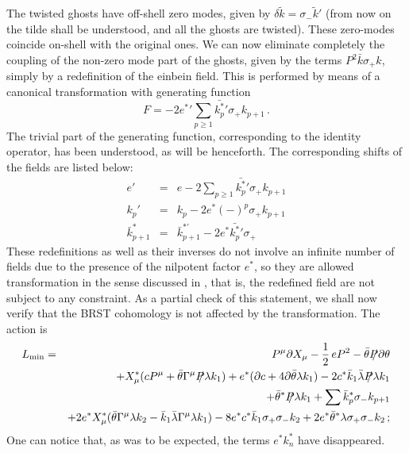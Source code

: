 \documentclass[a4paper,12pt]{article}
\begin{document}
The twisted ghosts have off-shell zero modes, given by $\delta \tilde
k = \sigma_- \tilde k'$ (from now on the tilde shall be understood,
and all the ghosts are twisted). These zero-modes coincide on-shell with the
original ones. We can now  eliminate completely the coupling of the
non-zero mode part of the ghosts, given by the terms $P^2 \bar
  k \sigma_+ k$, simply by a redefinition of the einbein
field. This is performed by means of a canonical transformation with
generating function
\begin{equation}
  F =  - 2 {e^*}' \sum_{p \geq 1} \bar {k_p^*}' \sigma_+ k_{p+1} \, . 
\end{equation}
The trivial part of the generating function, corresponding to the
identity operator, has been understood, as will be henceforth.
The corresponding shifts of the fields are listed below:
\begin{eqnarray}
  e'    &=& e - 2 \sum_{p \geq 1} \bar {k_p^*}' \sigma_+ k_{p+1} \nonumber\\
  k_p'  &=& k_p -2 e^* (-)^p \sigma_+ k_{p+1}  \\
  \bar k_{p+1}^* &=& {\bar k}_{p+1}^{*'} -2e^* \bar {k_p^*}' \sigma_+
  \nonumber 
\end{eqnarray}
These redefinitions as well as their inverses do not involve an
infinite number of fields due to the presence of the nilpotent factor
$e^*$, so they are allowed transformation in the sense discussed in
\cite{kallosh}, that is, the redefined field are not subject to any
constraint.
As a partial check of this statement, we shall now verify that the
BRST cohomology is not affected by the transformation.
The action is
\begin{eqnarray} \label{minaction}
 L_{\rm min}  & = & P^\mu \partial X_\mu -{1 \over 2}\, e P^2 -\bar\theta \SL{P}
 \partial\theta \nonumber \\
 && + X_\mu ^* (c P^\mu + \bar \theta \Gamma^\mu \SL{P} \lambda  k_1 ) + e^*
 (\partial c + 4 \partial \bar \theta \lambda k_1 ) -2 c^* \bar k_1
 \bar\lambda \SL{P} \lambda k_1  \nonumber \\
&& + \bar\theta^* \SL{P} \lambda k_1 + \sum 
   \bar k_p^* \sigma_- k_{p+1}\\
&& + 2 e^* X_\mu^*(\bar\theta \Gamma^\mu \lambda k_2 -
  \bar k_1 \bar\lambda 
  \Gamma^\mu \lambda k_1) -8 e^* c^* \bar k_1 \sigma_+ \sigma_- k_2 
 + 2 e^* \bar\theta^* \lambda \sigma_+ \sigma_- k_2 \, ; \nonumber 
\end{eqnarray}
One can notice that, as was to be expected, the terms $e^* k_n^*$ have
disappeared. 
\end{document}
